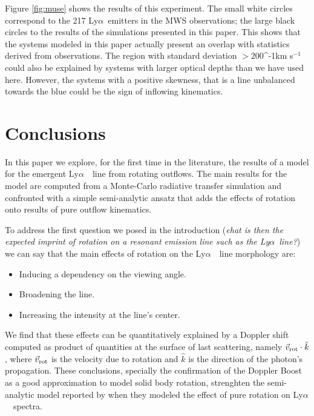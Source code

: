 \documentclass[a4paper,fleqn,usenatbib]{mnras}
\newcommand{\lya}{\ifmmode{{\rm Ly}\alpha}\else Ly$\alpha$\ \fi}
\newcommand{\kms}{\ifmmode\mathrm{km\ s}^{-1}\else km s$^{-1}$\fi}
\begin{document}
Figure \ref{fig:muse} shows the results of this experiment. 
The small white circles correspond to the 217 \lya emitters in the MWS
observations; the large black circles to the results of the
simulations presented in this paper. 
This shows that the systems modeled in this paper actually present an
overlap with statistics derived from observations. 
The region with standard deviation $>200$\kms could also be explained
by systems with larger optical depths than we have used here. 
However, the systems with a positive skewness, that is a line
unbalanced towards the blue could be the sign of inflowing
kinematics. 

\section{Conclusions}
\label{sec:conclusions}

In this paper we explore, for the first time in the literature,
the results of a model for the emergent \lya\ line from rotating outflows.
The main results for the model are computed from a Monte-Carlo
radiative transfer simulation and confronted with a simple
semi-analytic ansatz that adds the effects of rotation onto results of
pure outflow kinematics. 

To address the first question we posed in the introduction (\emph{ehat is then
the expected imprint of rotation on a resonant emission line such as
the \lya line?}) we can say that the main effects of rotation on the
\lya\ line morphology are: 

\begin{itemize}
  \item Inducing a dependency on the viewing angle.
  \item Broadening the line.
  \item Increasing the intensity at the line's center.
\end{itemize}

We find that these effects can be quantitatively explained by a
Doppler shift computed as product of quantities at the surface of last
scattering, namely  $\vec{v}_{\rm rot}\cdot \hat{k}$,  where
$\vec{v}_{\rm rot}$ is the velocity due to rotation and $\hat{k}$ is
the direction of the photon's propagation.  
These conclusions, specially the confirmation of the Doppler Boost as
a good approximation to model solid body rotation, strenghten the
semi-analytic model reported by \cite{Garavito14} when they modeled
the effect of pure rotation on \lya\ spectra. 
\end{document}
